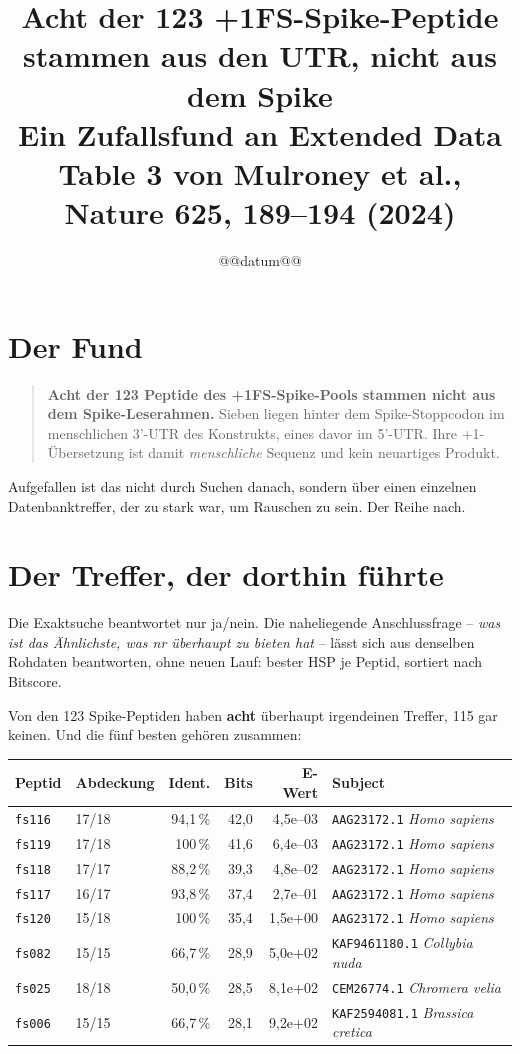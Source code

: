 \documentclass[11pt,a4paper]{article}
\title{\textbf{Acht der 123 +1FS-Spike-Peptide stammen aus den UTR,
nicht aus dem Spike}\\[2mm]
\large Ein Zufallsfund an Extended Data Table 3 von Mulroney et al.,
Nature 625, 189--194 (2024)}
\author{}
\date{@@datum@@}
\begin{document}
\maketitle
\thispagestyle{plain}

\section*{Der Fund}

\begin{quote}
\textbf{Acht der 123 Peptide des +1FS-Spike-Pools stammen nicht aus dem
Spike-Leserahmen.} Sieben liegen hinter dem Spike-Stoppcodon im menschlichen
3'-UTR des Konstrukts, eines davor im 5'-UTR. Ihre +1-Übersetzung ist damit
\emph{menschliche} Sequenz und kein neuartiges Produkt.
\end{quote}

Aufgefallen ist das nicht durch Suchen danach, sondern über einen einzelnen
Datenbanktreffer, der zu stark war, um Rauschen zu sein. Der Reihe nach.

\section{Der Treffer, der dorthin führte}
\label{sec:aehnlich}

Die Exaktsuche beantwortet nur ja/nein. Die naheliegende Anschlussfrage --
\emph{was ist das Ähnlichste, was nr überhaupt zu bieten hat} -- lässt sich aus
denselben Rohdaten beantworten, ohne neuen Lauf: bester HSP je Peptid, sortiert
nach Bitscore.

Von den 123 Spike-Peptiden haben \textbf{acht} überhaupt irgendeinen Treffer,
115 gar keinen. Und die fünf besten gehören zusammen:

\begin{center}
\footnotesize
\begin{tabular}{llrrrl}
\toprule
Peptid & Abdeckung & Ident. & Bits & E-Wert & Subject \\
\midrule
\texttt{fs116} & 17/18 & 94{,}1\,\% & 42{,}0 & 4{,}5e--03 & \texttt{AAG23172.1} \emph{Homo sapiens} \\
\texttt{fs119} & 17/18 & 100\,\% & 41{,}6 & 6{,}4e--03 & \texttt{AAG23172.1} \emph{Homo sapiens} \\
\texttt{fs118} & 17/17 & 88{,}2\,\% & 39{,}3 & 4{,}8e--02 & \texttt{AAG23172.1} \emph{Homo sapiens} \\
\texttt{fs117} & 16/17 & 93{,}8\,\% & 37{,}4 & 2{,}7e--01 & \texttt{AAG23172.1} \emph{Homo sapiens} \\
\texttt{fs120} & 15/18 & 100\,\% & 35{,}4 & 1{,}5e+00 & \texttt{AAG23172.1} \emph{Homo sapiens} \\
\midrule
\texttt{fs082} & 15/15 & 66{,}7\,\% & 28{,}9 & 5{,}0e+02 & \texttt{KAF9461180.1} \emph{Collybia nuda} \\
\texttt{fs025} & 18/18 & 50{,}0\,\% & 28{,}5 & 8{,}1e+02 & \texttt{CEM26774.1} \emph{Chromera velia} \\
\texttt{fs006} & 15/15 & 66{,}7\,\% & 28{,}1 & 9{,}2e+02 & \texttt{KAF2594081.1} \emph{Brassica cretica} \\
\bottomrule
\end{tabular}
\end{center}
\end{document}
